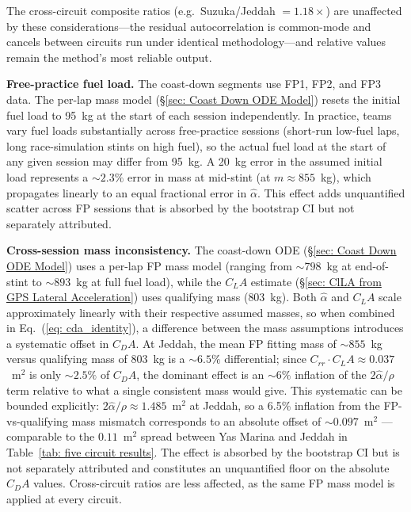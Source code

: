 The cross-circuit composite ratios (e.g.\ Suzuka/Jeddah $= 1.18\times$) are unaffected by these considerations---the residual autocorrelation is common-mode and cancels between circuits run under identical methodology---and relative values remain the method's most reliable output.

\textbf{Free-practice fuel load.} The coast-down segments use FP1, FP2, and FP3 data. The per-lap mass model (\S\ref{sec: Coast Down ODE Model}) resets the initial fuel load to 95~kg at the start of each session independently. In practice, teams vary fuel loads substantially across free-practice sessions (short-run low-fuel laps, long race-simulation stints on high fuel), so the actual fuel load at the start of any given session may differ from 95~kg. A 20~kg error in the assumed initial load represents a $\sim\!2.3\%$ error in mass at mid-stint (at $m \approx 855$~kg), which propagates linearly to an equal fractional error in $\hat\alpha$. This effect adds unquantified scatter across FP sessions that is absorbed by the bootstrap CI but not separately attributed.

\textbf{Cross-session mass inconsistency.} The coast-down ODE (\S\ref{sec: Coast Down ODE Model}) uses a per-lap FP mass model (ranging from $\sim\!798$~kg at end-of-stint to $\sim\!893$~kg at full fuel load), while the $C_LA$ estimate (\S\ref{sec: ClLA from GPS Lateral Acceleration}) uses qualifying mass ($803$~kg). Both $\hat{\alpha}$ and $C_LA$ scale approximately linearly with their respective assumed masses, so when combined in Eq.~(\ref{eq: cda_identity}), a difference between the mass assumptions introduces a systematic offset in $C_DA$. At Jeddah, the mean FP fitting mass of $\sim\!855$~kg versus qualifying mass of $803$~kg is a $\sim\!6.5\%$ differential; since $C_{rr}\cdot C_LA \approx 0.037$~m$^2$ is only $\sim\!2.5\%$ of $C_DA$, the dominant effect is an $\sim\!6\%$ inflation of the $2\hat{\alpha}/\rho$ term relative to what a single consistent mass would give. This systematic can be bounded explicitly: $2\hat{\alpha}/\rho \approx 1.485$~m$^2$ at Jeddah, so a 6.5\% inflation from the FP-vs-qualifying mass mismatch corresponds to an absolute offset of $\sim\!0.097$~m$^2$ --- comparable to the $0.11$~m$^2$ spread between Yas Marina and Jeddah in Table~\ref{tab: five circuit results}. The effect is absorbed by the bootstrap CI but is not separately attributed and constitutes an unquantified floor on the absolute $C_DA$ values. Cross-circuit ratios are less affected, as the same FP mass model is applied at every circuit.

